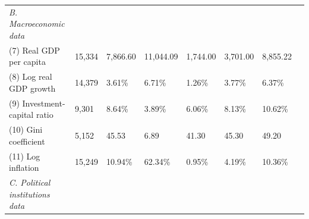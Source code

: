 \begin{tabularx}{\linewidth}{@{} l*{7}{Y} @{}}
\addlinespace[0.75ex]
\textit{B. Macroeconomic data}                                  &                                                       &                                                               &                                                       &                                                       &                                                       &                                                       \\
\hspace{0.5cm} (7) Real GDP per capita                  &          15,334                  &        7,866.60                       &       11,044.09                 &        1,744.00                 &        3,701.00                 &        8,855.22                 \\
\hspace{0.5cm} (8) Log real GDP growth                  &          14,379              &       3.61\%           &       6.71\%             &       1.26\%             &       3.77\%             &       6.37\%             \\
\hspace{0.5cm} (9) Investment-capital ratio             &           9,301                                  &       8.64\%                                       &       3.89\%                                 &       6.06\%                                 &       8.13\%                                 &       10.62\%                                 \\
\hspace{0.5cm} (10) Gini coefficient                    &           5,152              &           45.53           &            6.89             &           41.30             &           45.30             &           49.20             \\
\hspace{0.5cm} (11) Log inflation                               &          15,249               &       10.94\%            &       62.34\%              &       0.95\%              &       4.19\%              &       10.36\%              \\
\addlinespace[0.75ex]
\textit{C. Political institutions data}                 &                                                       &                                                               &                                                       &                                                       &                                                       &                                                       \\

\end{tabularx}
